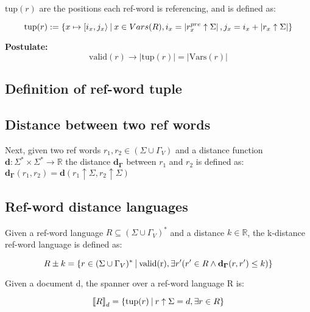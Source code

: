 \documentclass{article}
\newcommand{\abs}[1]{\left|#1\right|}
\newcommand{\set}[1]{\left\{#1\right\}}
\newcommand{\st}{\ \vline \ }
\newcommand{\dbrack}[1]{\left\llbracket#1\right\rrbracket}
\begin{document}
$\mathrm{tup}(r)$ are the positions each ref-word is referencing,
and is defined as:

\begin{equation}
    \mathrm{tup}(r) := \set{x \mapsto [i_x, j_x\rangle \st x \in
    Vars(R), i_x = \abs{r_x^{pre} \uparrow \Sigma}, j_x = i_x +
    \abs{r_x \uparrow \Sigma}}
\end{equation}

\textbf{Postulate:} 
\begin{equation}
    \mathrm{valid}(r) \rightarrow \abs{\mathrm{tup}(r)} = \abs{\mathrm{Vars}(r)}
\end{equation}
\subsection*{Definition of ref-word tuple}

\subsection*{Distance between two ref words}


Next, given two ref words $r_1, r_2 \in (\Sigma \cup \Gamma_V)$ and
a distance function 
$\mathbf{d} : \Sigma^* \times \Sigma^* \rightarrow \mathbb{R}$
the distance $\mathbf{d_\Gamma}$ between $r_1$ and $r_2$
is defined as: $\mathbf{d_\Gamma}(r_1, r_2) = \mathbf{d}(r_1 \uparrow
\Sigma, r_2 \uparrow \Sigma)$

\subsection*{Ref-word distance languages}

Given a ref-word language $R \subseteq (\Sigma\cup\Gamma_V)^*$ and
a distance $k \in \mathbb{R}$, the k-distance ref-word language is
defined as:

\begin{equation}
    R \pm k = \set{r \in (\Sigma \cup \Gamma_V)^* \st  \mathrm{valid(r)},
    \exists r' (r'\in R \land \mathbf{d_\Gamma}(r, r') \leq k)}
\end{equation}

Given a document d, the spanner over a ref-word language R is:

\begin{equation}
    \dbrack{R}_d = \set{\mathrm{tup}(r) \st r\uparrow \Sigma = d,
    \exists r \in R}
\end{equation}
\end{document}
